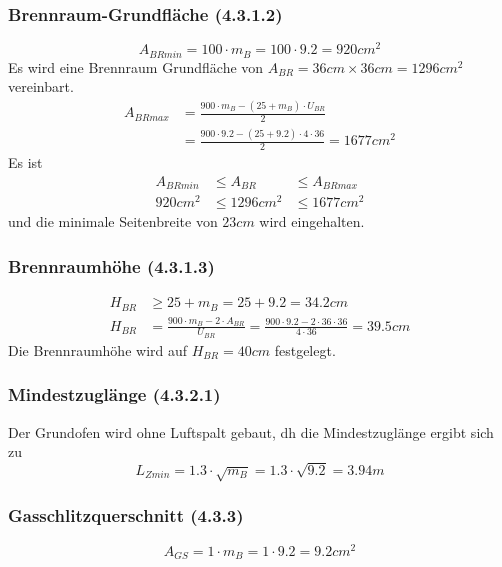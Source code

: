 \documentclass[a4paper,10pt,twoside]{article}
\begin{document}
\subsubsection{Brennraum-Grundfläche (4.3.1.2)}
\label{sec:org4fda0f9}
\begin{equation}
A_{BRmin}=100 \cdot m_B = 100 \cdot 9.2 = 920 cm^2
\end{equation}
Es wird eine Brennraum Grundfläche von \(A_{BR} = 36 cm \times 36 cm = 1296 cm^2\) vereinbart.
\begin{align}
A_{BRmax}& =\frac{900 \cdot m_B - ( 25 + m_B) \cdot U_{BR}}{2} \\
         & =\frac{900 \cdot 9.2 - ( 25 + 9.2) \cdot 4 \cdot 36}{2} = 1677 cm^2
\end{align}
Es ist
\begin{align}
	A_{BRmin} &\le A_{BR} &\le A_{BRmax} \\
	920 cm^2  &\le 1296 cm^2  &\le 1677 cm^2
\end{align}
und die minimale Seitenbreite von \(23 cm\) wird eingehalten.
\subsubsection{Brennraumhöhe (4.3.1.3)}
\label{sec:org907690a}
\begin{align}
H_{BR} &\ge 25 + m_B = 25 + 9.2 = 34.2 cm \\
H_{BR} &= \frac{900\cdot m_B - 2 \cdot A_{BR}}{U_{BR}} = \frac{900\cdot 9.2 - 2 \cdot 36 \cdot 36}{4 \cdot 36} = 39.5 cm
\end{align}
Die Brennraumhöhe wird auf \(H_{BR} = 40 cm\) festgelegt.

\subsubsection{Mindestzuglänge (4.3.2.1)}
\label{sec:org8835802}
Der Grundofen wird ohne Luftspalt gebaut, dh die Mindestzuglänge ergibt sich zu
\begin{equation}
 L_{Zmin} = 1.3 \cdot \sqrt{m_B} = 1.3 \cdot \sqrt{9.2} = 3.94 m
\end{equation}
\subsubsection{Gasschlitzquerschnitt (4.3.3)}
\label{sec:orgf097d90}
\begin{equation}
A_{GS} = 1 \cdot m_B = 1 \cdot 9.2 = 9.2 cm^2
\end{equation}
\end{document}
